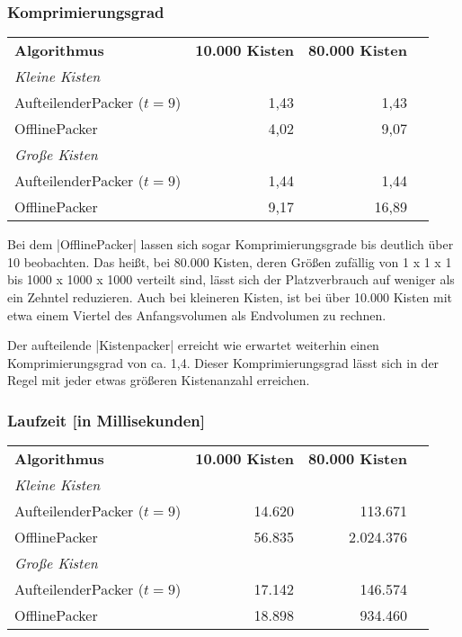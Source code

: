 \subsubsection*{Komprimierungsgrad}
\begin{center}
\begin{tabular}{lrrr}
\vspace*{.42em}
\textbf{Algorithmus}   & \textbf{10.000 Kisten} & \textbf{80.000 Kisten}\\
\textit{Kleine Kisten} & & \\
 AufteilenderPacker ($t=9$)  	& 1,43		& 1,43			\\
\vspace*{.42em}
 OfflinePacker			& 4,02		& 9,07			\\
\textit{Große Kisten} & & \\
 AufteilenderPacker ($t=9$)  	& 1,44		& 1,44			\\
 OfflinePacker			& 9,17		& 16,89			\\
\end{tabular}
\end{center}
 Bei dem |OfflinePacker| lassen sich sogar Komprimierungsgrade bis deutlich über 10 beobachten.
 Das heißt, bei 80.000 Kisten, deren Größen zufällig von 1 x 1 x 1 bis 1000 x 1000 x 1000 verteilt sind,
  lässt sich der Platzverbrauch auf weniger als ein Zehntel reduzieren.
 Auch bei kleineren Kisten, ist bei über 10.000 Kisten mit etwa einem Viertel des Anfangsvolumen als Endvolumen zu rechnen.

 Der aufteilende |Kistenpacker| erreicht wie erwartet weiterhin einen Komprimierungsgrad von ca. 1,4.
 Dieser Komprimierungsgrad lässt sich in der Regel mit jeder etwas größeren Kistenanzahl erreichen.
 
\subsubsection*{Laufzeit [in Millisekunden]}
\begin{center}
\begin{tabular}{lrrr}
\vspace*{.42em}
\textbf{Algorithmus} 	& \textbf{10.000 Kisten} & \textbf{80.000 Kisten} \\
\textit{Kleine Kisten} & & \\
 AufteilenderPacker ($t=9$)  	& 14.620	& 113.671		\\
 OfflinePacker			& 56.835	& 2.024.376		\\
\vspace*{.42em}
\textit{Große Kisten} & & \\
 AufteilenderPacker ($t=9$)  	& 17.142	& 146.574		\\
 OfflinePacker			& 18.898	& 934.460		\\
\end{tabular}
\end{center}


